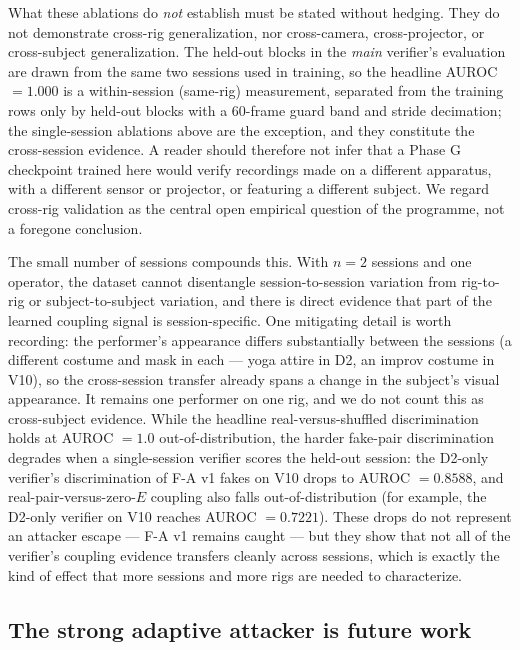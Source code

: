 What these ablations do \emph{not} establish must be stated without hedging. They do not demonstrate cross-rig generalization, nor cross-camera, cross-projector, or cross-subject generalization. The held-out blocks in the \emph{main} verifier's evaluation are drawn from the same two sessions used in training, so the headline AUROC $=1.000$ is a within-session (same-rig) measurement, separated from the training rows only by held-out blocks with a 60-frame guard band and stride decimation; the single-session ablations above are the exception, and they constitute the cross-session evidence. A reader should therefore not infer that a Phase G checkpoint trained here would verify recordings made on a different apparatus, with a different sensor or projector, or featuring a different subject. We regard cross-rig validation as the central open empirical question of the programme, not a foregone conclusion.

The small number of sessions compounds this. With $n=2$ sessions and one operator, the dataset cannot disentangle session-to-session variation from rig-to-rig or subject-to-subject variation, and there is direct evidence that part of the learned coupling signal is session-specific. One mitigating detail is worth recording: the performer's appearance differs substantially between the sessions (a different costume and mask in each --- yoga attire in D2, an improv costume in V10), so the cross-session transfer already spans a change in the subject's visual appearance. It remains one performer on one rig, and we do not count this as cross-subject evidence. While the headline real-versus-shuffled discrimination holds at AUROC $=1.0$ out-of-distribution, the harder fake-pair discrimination degrades when a single-session verifier scores the held-out session: the D2-only verifier's discrimination of F-A v1 fakes on V10 drops to AUROC $=0.8588$, and real-pair-versus-zero-$E$ coupling also falls out-of-distribution (for example, the D2-only verifier on V10 reaches AUROC $=0.7221$). These drops do not represent an attacker escape --- F-A v1 remains caught --- but they show that not all of the verifier's coupling evidence transfers cleanly across sessions, which is exactly the kind of effect that more sessions and more rigs are needed to characterize.

\subsection{The strong adaptive attacker is future work}\label{sec:discussion:adaptive}

